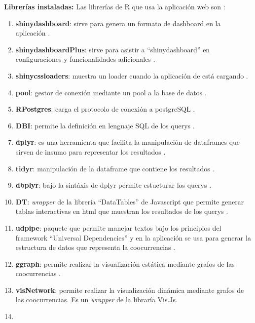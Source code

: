\documentclass[
  12pt,
  openany]{book}
\begin{document}
\begin{enumerate}
\begin{enumerate}
    \textbf{Librerías instaladas:} Las librerías de R que usa la aplicación web son :

    \begin{enumerate}
    \def\labelenumiii{\arabic{enumiii}.}
    \item
      \textbf{shinydashboard}: sirve para genera un formato de dashboard en la aplicación \citep{shinydashboard}.
    \item
      \textbf{shinydashboardPlus}: sirve para asistir a ``shinydashboard'' en configuraciones y funcionalidades adicionales \citep{shinydashboardPlus}.
    \item
      \textbf{shinycssloaders}: muestra un loader cuando la aplicación de está cargando \citep{shinycssloaders}.
    \item
      \textbf{pool}: gestor de conexión mediante un pool a la base de datos \citep{pool}.
    \item
      \textbf{RPostgres}: carga el protocolo de conexión a postgreSQL \citep{RPostgres}.
    \item
      \textbf{DBI}: permite la definición en lenguaje SQL de los querys \citep{DBI}.
    \item
      \textbf{dplyr}: es una herramienta que facilita la manipulación de dataframes que sirven de insumo para representar los resultados \citep{dplyr}.
    \item
      \textbf{tidyr}: manipulación de la dataframe que contiene los resultados \citep{tidyr}.
    \item
      \textbf{dbplyr}: bajo la sintáxis de dplyr permite estucturar los querys \citep{dbplyr}.
    \item
      \textbf{DT}: \emph{wrapper} de la librería ``DataTables'' de Javascript que permite generar tablas interactivas en html que muestran los resultados de los querys \citep{DT-2}.
    \item
      \textbf{udpipe}: paquete que permite manejar textos bajo los principios del framework ``Universal Dependencies'' y en la aplicación se usa para generar la estructura de datos que representa la coocurrencias \citep{udpipe-3}.
    \item
      \textbf{ggraph}: permite realizar la visualización estática mediante grafos de las coocurrencias \citep{ggraph-2}.
    \item
      \textbf{visNetwork}: permite realizar la visualización dinámica mediante grafos de las coocurrencias. Es un \emph{wrapper} de la libraría Vis.Js.
    \item

\end{enumerate}
\end{enumerate}
\end{enumerate}
\end{document}
